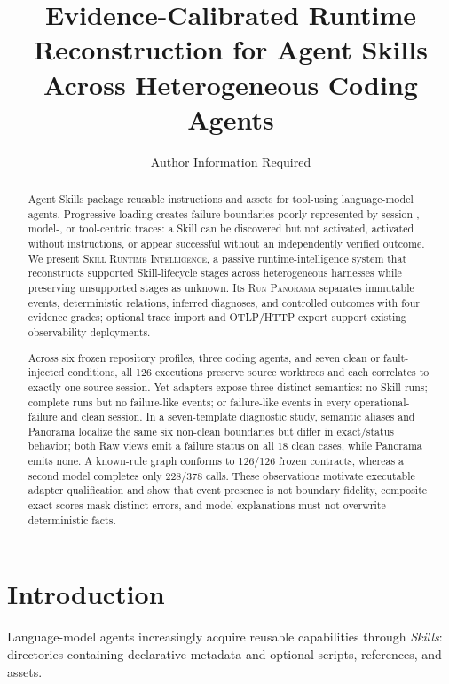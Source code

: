 \documentclass[runningheads]{llncs}
\title{Evidence-Calibrated Runtime Reconstruction for Agent Skills Across
Heterogeneous Coding Agents}
\author{Author Information Required}
\institute{Affiliation and email required before submission}
\newcommand{\system}{\textsc{Skill Runtime Intelligence}\xspace}
\newcommand{\panorama}{\textsc{Run Panorama}\xspace}
\begin{document}
\maketitle

\begin{abstract}
Agent Skills package reusable instructions and assets for tool-using
language-model agents. Progressive loading creates failure boundaries poorly
represented by session-, model-, or tool-centric traces: a Skill can be
discovered but not activated, activated without instructions, or appear
successful without an independently verified outcome. We present \system, a
passive runtime-intelligence system that reconstructs supported Skill-lifecycle
stages across heterogeneous harnesses while preserving unsupported stages as
unknown. Its \panorama separates immutable events, deterministic relations,
inferred diagnoses, and controlled outcomes with four evidence grades; optional
trace import and OTLP/HTTP export support existing observability deployments.

Across six frozen repository profiles, three coding agents, and seven clean or
fault-injected conditions, all 126 executions preserve source worktrees and
each correlates to exactly one source session. Yet adapters expose three distinct semantics:
no Skill runs; complete runs but no failure-like events; or failure-like events
in every operational-failure and clean session. In a seven-template diagnostic
study, semantic aliases and Panorama localize the same six non-clean boundaries
but differ in exact/status behavior; both Raw views emit a failure status on all
18 clean cases, while Panorama emits none. A known-rule graph conforms to
126/126 frozen contracts, whereas a second model completes only 228/378 calls.
These observations motivate executable adapter qualification and show that event
presence is not boundary fidelity, composite exact scores mask distinct errors,
and model explanations must not overwrite deterministic facts.
\end{abstract}


\section{Introduction}

Language-model agents increasingly acquire reusable capabilities through
\emph{Skills}: directories containing declarative metadata and optional
scripts, references, and assets.
\end{document}

